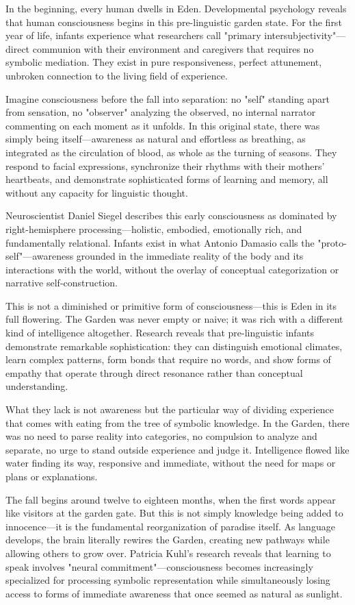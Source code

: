 In the beginning, every human dwells in Eden. Developmental psychology reveals that human consciousness begins in this pre-linguistic garden state. For the first year of life, infants experience what researchers call "primary intersubjectivity"—direct communion with their environment and caregivers that requires no symbolic mediation. They exist in pure responsiveness, perfect attunement, unbroken connection to the living field of experience.

Imagine consciousness before the fall into separation: no "self" standing apart from sensation, no "observer" analyzing the observed, no internal narrator commenting on each moment as it unfolds. In this original state, there was simply being itself—awareness as natural and effortless as breathing, as integrated as the circulation of blood, as whole as the turning of seasons. They respond to facial expressions, synchronize their rhythms with their mothers' heartbeats, and demonstrate sophisticated forms of learning and memory, all without any capacity for linguistic thought.

Neuroscientist Daniel Siegel describes this early consciousness as dominated by right-hemisphere processing—holistic, embodied, emotionally rich, and fundamentally relational. Infants exist in what Antonio Damasio calls the "proto-self"—awareness grounded in the immediate reality of the body and its interactions with the world, without the overlay of conceptual categorization or narrative self-construction.

This is not a diminished or primitive form of consciousness—this is Eden in its full flowering. The Garden was never empty or naive; it was rich with a different kind of intelligence altogether. Research reveals that pre-linguistic infants demonstrate remarkable sophistication: they can distinguish emotional climates, learn complex patterns, form bonds that require no words, and show forms of empathy that operate through direct resonance rather than conceptual understanding.

What they lack is not awareness but the particular way of dividing experience that comes with eating from the tree of symbolic knowledge. In the Garden, there was no need to parse reality into categories, no compulsion to analyze and separate, no urge to stand outside experience and judge it. Intelligence flowed like water finding its way, responsive and immediate, without the need for maps or plans or explanations.

The fall begins around twelve to eighteen months, when the first words appear like visitors at the garden gate. But this is not simply knowledge being added to innocence—it is the fundamental reorganization of paradise itself. As language develops, the brain literally rewires the Garden, creating new pathways while allowing others to grow over. Patricia Kuhl's research reveals that learning to speak involves "neural commitment"—consciousness becomes increasingly specialized for processing symbolic representation while simultaneously losing access to forms of immediate awareness that once seemed as natural as sunlight.

